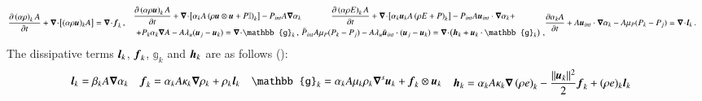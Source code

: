 \documentclass[preprint,10pt]{elsarticle}
\begin{document}
\begin{subequations}\label{eq:reg-7-eqn}
\begin{align}
  \label{multi-d-7-equ-liq}
  \frac{\partial \left( \alpha \rho \right)_{k} A}{\partial t}
  + \div \left[ (\alpha \rho \mbold u)_k A\right]
  &= \div \mbold f_k\,,
\end{align}
\begin{multline}\label{eq:multi-7-eqn-mom}
  \frac{\partial \left( \alpha \rho \mbold u \right)_{k} A}{\partial t}
  + \div \left[ \alpha_{k} A \left( \rho \mbold u \otimes \mbold u + P \mathbb{I} \right)_{k} \right]
  - P_{int} A \grad \alpha_{k} 
  \\
  + P_{k} \alpha_{k} \grad A
  - A \lambda_u (\mbold u_{j} - \mbold u_{k})
  =  \div \mathbb{g}_k \,,
\end{multline}
\begin{multline}\label{eq:multi-7-eqn-energy}
  \frac{\partial \left( \alpha \rho E \right)_{k} A}{\partial t}
  + \div \left[ \alpha_{k} \mbold u_{k} A \left( \rho E + P \right)_{k} \right]
  - P_{int} A \mbold u_{int} \cdot \grad \alpha_{k} + 
  \\
  \bar{P}_{int} A \mu_P (P_{k} - P_{j})
  - A \lambda_u \bar{\mbold u}_{int} \cdot (\mbold u_{j} - \mbold u_{k})
  = \div \left( \mbold h_k + \mbold u_k \cdot \mathbb{g}_k \right) \, ,
\end{multline}
\begin{align}
  \label{eqn:multi-d-7-eqn-liq-vol}
  \frac{\partial \alpha_{k} A}{\partial t} + A\mbold u_{int} \cdot \grad \alpha_{k}
  &- A \mu_P (P_{k} - P_{j}) = \div \mbold l_k\, .
\end{align}
\end{subequations}
%
The dissipative terms $\boldsymbol l_k$, $\boldsymbol f_k$, $\mathbb{g}_k$ and $\boldsymbol h_k$ are as follows (\cite{Marco_paper_sem}):
%
\begin{subequations}\label{eq:visc-reg-7-equ}
\begin{align}
  \mbold l_k &= \beta_k A \grad \alpha_k 
\end{align}
\begin{align}
  \mbold f_k &= \alpha_k A \kappa_k \grad \rho_k + \rho_k  \mbold l_k 
\end{align}
\begin{align}
\mathbb{g}_k &= \alpha_k A \mu_k \rho_k \grad^s \mbold u_k + \mbold f_k \otimes \mbold u_k 
\end{align}
\begin{align}
  \mbold h_k &=  \alpha_k A \kappa_k \grad \left( \rho e \right)_k  - \frac{\| \mbold u_k \|^2}{2} \mbold f_k + (\rho e)_k \mbold l_k 
\end{align}
\end{subequations}
\end{document}
